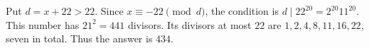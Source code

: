 Put $d=x+22>22$. Since $x\equiv-22\pmod d$, the condition is $d\mid22^{20}=2^{20}11^{20}$. This number has $21^2=441$ divisors. Its divisors at most $22$ are $1,2,4,8,11,16,22$, seven in total. Thus the answer is $\boxed{434}$.
